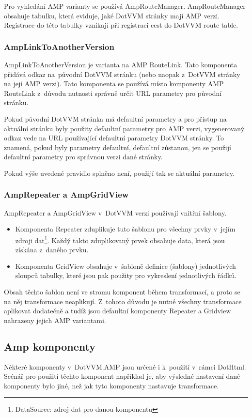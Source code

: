 Pro vyhledání AMP varianty se používá AmpRouteManager. AmpRouteManager obsahuje tabulku, která eviduje, jaké DotVVM stránky mají AMP verzi. Registrace do této tabulky vznikají při registraci cest do DotVVM route table.

\subsubsection*{AmpLinkToAnotherVersion}
AmpLinkToAnotherVersion je varianta na AMP RouteLink. Tato komponenta přidává odkaz na~původní DotVVM stránku (nebo naopak z~DotVVM stránky na její AMP verzi). Tato komponenta se používá místo komponenty AMP RouteLink z~důvodu nutnosti správně určit URL parametry pro původní stránku.

Pokud původní DotVVM stránka má defaultní parametry a pro přístup na aktuální stránku byly použity defaultní parametry pro AMP verzi, vygenerovaný odkaz vede na URL používající defaultní parametry DotVVM stránky. To znamená, pokud byly parametry defaultní, defaultní zůstanou, jen se použijí defaultní parametry pro správnou verzi dané stránky.

Pokud výše uvedené pravidlo splněno není, použijí tak se aktuální parametry.

\subsubsection*{AmpRepeater a AmpGridView}
AmpRepeater a AmpGridView v~DotVVM verzi používají vnitřní šablony.

\begin{itemize}
    \item Komponenta Repeater zduplikuje tuto šablonu pro všechny prvky v~jejím zdroji dat\footnote{DataSource: zdroj dat pro danou komponentu}. Každý takto zduplikovaný prvek obsahuje data, která jsou získána z~daného prvku.
    \item Komponenta GridView obsahuje v~šabloně definice (šablony) jednotlivých sloupců tabulky, které jsou pak použity pro vykreslení jednotlivých řádků.
\end{itemize}

Obsah těchto šablon není ve stromu komponent během transformací, a proto se na něj transformace neaplikují. Z~tohoto důvodu je nutné všechny transformace aplikovat dodatečně a tudíž jsou defaultní komponenty Repeater a Gridview nahrazeny jejich AMP variantami.

\subsection*{Amp komponenty}
 Některé komponenty v~DotVVM.AMP jsou určené i k~použití v~rámci DotHtml. Scénář pro použití těchto komponent například je, aby výsledné nastavení dané komponenty bylo jiné, než jak tyto komponenty nastavuje transformace.
